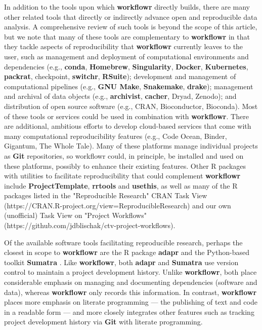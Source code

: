 \documentclass[9pt,a4paper]{extarticle}
\begin{document}
In addition to the tools upon which \textbf{workflowr} directly builds, there are
many other related tools that directly or indirectly advance open and
reproducible data analysis. A comprehensive review of such tools is
beyond the scope of this article, but we note that many of these tools
are complementary to \textbf{workflowr} in that they tackle aspects of
reproducibility that \textbf{workflowr} currently leaves to the user, such as
management and deployment of computational environments and dependencies
(e.g., \textbf{conda}, \textbf{Homebrew}, \textbf{Singularity}, \textbf{Docker}, \textbf{Kubernetes}, \textbf{packrat},
checkpoint, \textbf{switchr}, \textbf{RSuite}); development and management of
computational pipelines (e.g., \textbf{GNU Make}, \textbf{Snakemake}, \textbf{drake}); management
and archival of data objects (e.g., \textbf{archivist}, \textbf{cacher}, Dryad, Zenodo);
and distribution of open source software (e.g., CRAN, Bioconductor,
Bioconda). Most of these tools or services could be used in combination
with \textbf{workflowr}. There are additional, ambitious efforts to develop
cloud-based services that come with many computational reproducibility
features (e.g., Code Ocean, Binder, Gigantum, The Whole Tale). Many of
these platforms manage individual projects as \textbf{Git} repositories, so
workflowr could, in principle, be installed and used on these platforms,
possibly to enhance their existing features. Other R packages with
utilities to facilitate reproducibility that could complement \textbf{workflowr}
include \textbf{ProjectTemplate}, \textbf{rrtools} and \textbf{usethis}, as well as many of the R
packages listed in the "Reproducible Research" CRAN Task View
(https://CRAN.R-project.org/view=ReproducibleResearch) and our own
(unofficial) Task View on "Project Workflows"
(https://github.com/jdblischak/ctv-project-workflows).

Of the available software tools facilitating reproducible research,
perhaps the closest in scope to \textbf{workflowr} are the R package \textbf{adapr}
\cite{Gelfond2018} and the Python-based toolkit \textbf{Sumatra}
\cite{Davidson2014}. Like \textbf{workflowr}, both \textbf{adapr} and \textbf{Sumatra} use version
control to maintain a project development history. Unlike \textbf{workflowr},
both place considerable emphasis on managing and documenting
dependencies (software and data), whereas \textbf{workflowr} only records this
information. In contrast, \textbf{workflowr} places more emphasis on literate
programming --- the publishing of text and code in a readable form ---
and more closely integrates other features such as tracking project
development history via \textbf{Git} with literate programming.
\end{document}
